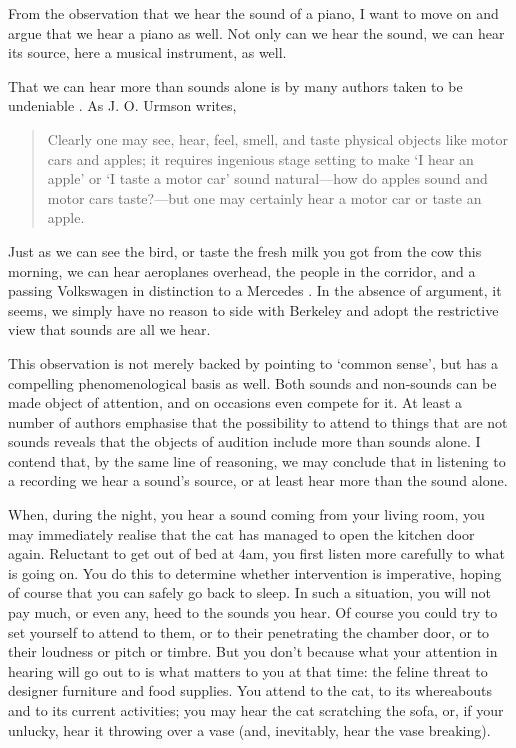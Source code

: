 \documentclass[sloppy, journal, git, bytitle, dodraft]{humapap}
\begin{document}

\sect From the observation that we hear the sound of a piano, I want to move on and argue that we hear a piano as well. Not only can we hear the sound, we can hear its source, here a musical instrument, as well. 

That we can hear more than sounds alone is by many authors taken to be undeniable \autocites{nudds2010aa, ocallaghan2011aa}. As J. O. Urmson writes, 
\begin{quote}
Clearly one may see, hear, feel, smell, and taste physical objects like motor cars and apples; it requires ingenious stage setting to make `I hear an apple' or `I taste a motor car' sound natural---how do apples sound and motor cars taste?---but one may certainly hear a motor car or taste an apple.\autocite[p. 117]{urmson1968aa}
\end{quote} Just as we can see the bird, or taste the fresh milk you got from the cow this morning, we can hear aeroplanes overhead, the people in the corridor, and a passing Volkswagen in distinction to a Mercedes \autocite{heidegger}. In the absence of argument, it seems, we simply have no reason to side with Berkeley and adopt the restrictive view that sounds are all we hear. 

This observation is not merely backed by pointing to `common sense', but has a compelling phenomenological basis as well. Both sounds and non-sounds can be made object of attention, and on occasions even compete for it. At least a number of authors emphasise that the possibility to attend to things that are not sounds reveals that the objects of audition include more than sounds alone. I contend that, by the same line of reasoning, we may conclude that in listening to a recording we hear a sound's source, or at least hear more than the sound alone. 
	
When, during the night, you hear a sound coming from your living room, you may immediately realise that the cat has managed to open the kitchen door again. Reluctant to get out of bed at 4am, you first listen more carefully to what is going on. You do this to determine whether intervention is imperative, hoping of course that you can safely go back to sleep. In such a situation, you will not pay much, or even any, heed to the sounds you hear. Of course you could try to set yourself to attend to them, or to their penetrating the chamber door, or to their loudness or pitch or timbre. But you don't because what your attention in hearing will go out to is what matters to you at that time: the feline threat to designer furniture and food supplies. You attend to the cat, to its whereabouts and to its current activities; you may hear the cat scratching the sofa, or, if your unlucky, hear it throwing over a vase (and, inevitably, hear the vase breaking).
\end{document}
